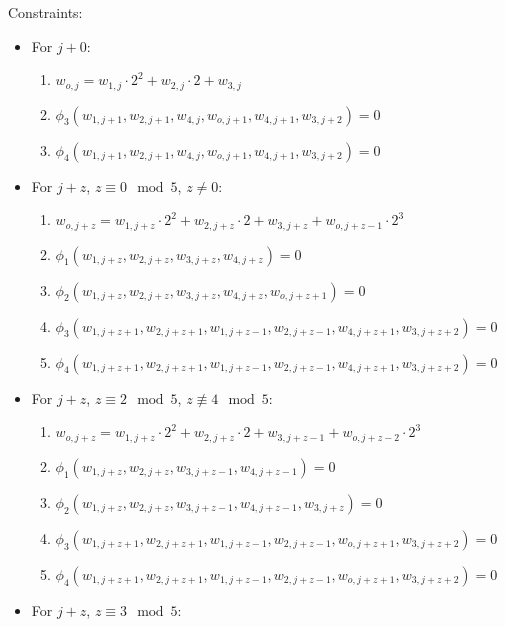 Constraints:
\begin{itemize}
	\item For $j + 0$:
	\begin{enumerate}
		\item $w_{o, j} = w_{1, j} \cdot 2^2 + w_{2, j} \cdot 2 + w_{3, j}$ 
		\item $\phi_3(w_{1, j + 1}, w_{2, j + 1}, w_{4, j}, w_{o, j + 1}, w_{4, j + 1}, w_{3, j + 2}) = 0$
		\item $\phi_4(w_{1, j + 1}, w_{2, j + 1}, w_{4, j}, w_{o, j + 1}, w_{4, j + 1}, w_{3, j + 2}) = 0$
	\end{enumerate}
	\item For $j + z$, $z \equiv 0 \mod 5$, $z \neq 0$:
	\begin{enumerate}
		\item $w_{o, j + z} = w_{1, j + z} \cdot 2^2 + w_{2, j + z} \cdot 2 + w_{3, j + z} + w_{o, j + z - 1} \cdot 2^3$ 
		\item $\phi_1(w_{1, j + z}, w_{2, j + z}, w_{3, j + z}, w_{4, j + z}) = 0$
		\item $\phi_2(w_{1, j + z}, w_{2, j + z}, w_{3, j + z}, w_{4, j + z}, w_{o, j + z + 1}) = 0$
		\item $\phi_3(w_{1, j + z + 1}, w_{2, j + z + 1}, w_{1, j + z - 1}, w_{2, j + z - 1}, w_{4, j + z + 1}, w_{3, j + z + 2}) = 0$
		\item $\phi_4(w_{1, j + z + 1}, w_{2, j + z + 1}, w_{1, j + z - 1}, w_{2, j + z - 1}, w_{4, j + z + 1}, w_{3, j + z + 2}) = 0$
	\end{enumerate}
	\item For $j + z$, $z \equiv 2 \mod 5$, $z \not\equiv 4 \mod 5$:
	\begin{enumerate}
		\item $w_{o, j + z} = w_{1, j + z} \cdot 2^2 + w_{2,j + z} \cdot 2 + w_{3, j + z - 1} + w_{o, j+ z - 2} \cdot 2^3$
		\item $\phi_1(w_{1, j + z}, w_{2, j + z}, w_{3, j + z - 1}, w_{4, j + z - 1}) = 0$
		\item $\phi_2(w_{1, j + z}, w_{2, j + z}, w_{3, j + z - 1}, w_{4, j + z - 1}, w_{3, j + z}) = 0$
		\item $\phi_3(w_{1, j + z + 1}, w_{2, j + z + 1}, w_{1, j + z - 1}, w_{2, j + z - 1}, w_{o, j + z + 1}, w_{3, j + z + 2}) = 0$
		\item $\phi_4(w_{1, j + z + 1}, w_{2, j + z + 1}, w_{1, j + z - 1}, w_{2, j + z - 1}, w_{o, j + z + 1}, w_{3, j + z + 2}) = 0$
	\end{enumerate}
	\item For $j + z$, $z \equiv 3 \mod 5$:

\end{itemize}

